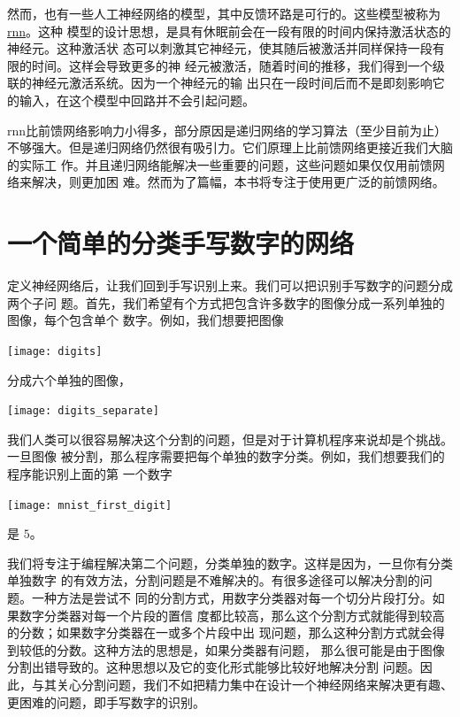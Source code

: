 然而，也有一些人工神经网络的模型，其中反馈环路是可行的。这些模型被称为%
\href{http://en.wikipedia.org/wiki/Recurrent_neural_network}{\gls{rnn}}。这种
模型的设计思想，是具有休眠前会在一段有限的时间内保持激活状态的神经元。这种激活状
态可以刺激其它神经元，使其随后被激活并同样保持一段有限的时间。这样会导致更多的神
经元被激活，随着时间的推移，我们得到一个级联的神经元激活系统。因为一个神经元的输
出只在一段时间后而不是即刻影响它的输入，在这个模型中回路并不会引起问题。

\gls*{rnn}比前馈网络影响力小得多，部分原因是递归网络的学习算法（至少目前为止）
不够强大。但是递归网络仍然很有吸引力。它们原理上比前馈网络更接近我们大脑的实际工
作。并且递归网络能解决一些重要的问题，这些问题如果仅仅用前馈网络来解决，则更加困
难。然而为了篇幅，本书将专注于使用更广泛的前馈网络。

\section{一个简单的分类手写数字的网络}

定义神经网络后，让我们回到手写识别上来。我们可以把识别手写数字的问题分成两个子问
题。首先，我们希望有个方式把包含许多数字的图像分成一系列单独的图像，每个包含单个
数字。例如，我们想要把图像
\begin{center}
  \texttt{[image: digits]}
\end{center}
分成六个单独的图像，
\begin{center}
  \texttt{[image: digits\_separate]}
\end{center}

我们人类可以很容易解决这个分割的问题，但是对于计算机程序来说却是个挑战。一旦图像
被分割，那么程序需要把每个单独的数字分类。例如，我们想要我们的程序能识别上面的第
一个数字
\begin{center}
  \texttt{[image: mnist\_first\_digit]}
\end{center}
是 $5$。

我们将专注于编程解决第二个问题，分类单独的数字。这样是因为，一旦你有分类单独数字
的有效方法，分割问题是不难解决的。有很多途径可以解决分割的问题。一种方法是尝试不
同的分割方式，用数字分类器对每一个切分片段打分。如果数字分类器对每一个片段的置信
度都比较高，那么这个分割方式就能得到较高的分数；如果数字分类器在一或多个片段中出
现问题，那么这种分割方式就会得到较低的分数。这种方法的思想是，如果分类器有问题，
那么很可能是由于图像分割出错导致的。这种思想以及它的变化形式能够比较好地解决分割
问题。因此，与其关心分割问题，我们不如把精力集中在设计一个神经网络来解决更有趣、
更困难的问题，即手写数字的识别。

